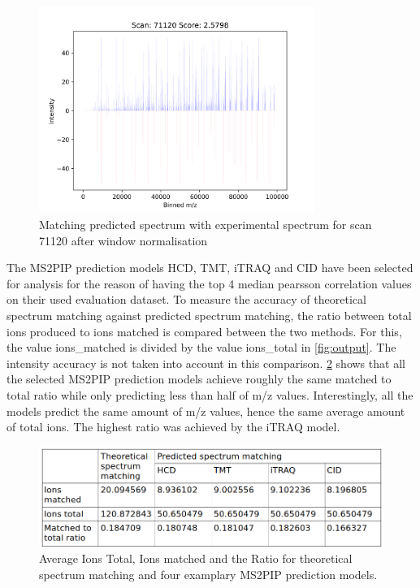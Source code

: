 \documentclass[11pt]{article}
\begin{document}
\begin{figure}[ht]
\centering
\includegraphics[width=0.8\textwidth]{figs/scan_71120_ps=True_wins.png}
\caption{Matching predicted spectrum with experimental spectrum for scan 71120 after window normalisation}
\label{fig:scanwin}
\end{figure}

The MS2PIP prediction models HCD, TMT, iTRAQ and CID have been selected for analysis for the reason of having the top 4 median pearsson correlation values on their used evaluation dataset.
To measure the accuracy of theoretical spectrum matching against predicted spectrum matching, the ratio between total ions produced to ions matched is compared between the two methods. For this, the value ions\_matched is divided by the value ions\_total in \cref{fig:output}. The intensity accuracy is not taken into account in this comparison. \cref{fig:ratio_table} shows that all the selected MS2PIP prediction models achieve roughly the same matched to total ratio while only predicting less than half of m/z values. Interestingly, all the models predict the same amount of m/z values, hence the same average amount of total ions. The highest ratio was achieved by the iTRAQ model.

\begin{figure}[ht]
\centering
\includegraphics[width=1\textwidth]{figs/ratio_table.png}
\caption{Average Ions Total, Ions matched and the Ratio for theoretical spectrum matching and four examplary MS2PIP prediction models.}
\label{fig:ratio_table}
\end{figure}
\end{document}
